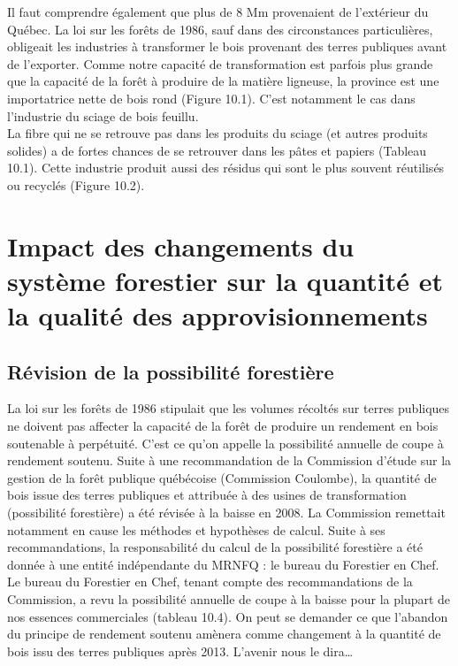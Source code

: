 Il faut comprendre également que plus de 8 Mm provenaient de l'extérieur du Québec. La loi sur les forêts de 1986, sauf dans des circonstances particulières, obligeait les industries à transformer le bois provenant des terres publiques avant de l'exporter. Comme notre capacité de transformation est parfois plus grande que la capacité de la forêt à produire de la matière ligneuse, la province est une importatrice nette de bois rond (Figure 10.1). C'est notamment le cas dans l'industrie du sciage de bois feuillu.\\ 

La fibre qui ne se retrouve pas dans les produits du sciage (et autres produits solides) a de fortes chances de se retrouver dans les pâtes et papiers (Tableau 10.1). Cette industrie produit aussi des résidus qui sont le plus souvent réutilisés ou recyclés (Figure 10.2).


\section{Impact des changements du système forestier sur la quantité et la qualité des approvisionnements}

\subsection{Révision de la possibilité forestière}
La loi sur les forêts  de 1986 stipulait que les volumes récoltés sur terres publiques ne doivent pas affecter la capacité de la forêt de produire un rendement en bois soutenable à perpétuité. C'est ce qu'on appelle la possibilité annuelle de coupe à rendement soutenu. Suite à une recommandation de la Commission d'étude sur la gestion de la forêt publique québécoise (Commission Coulombe), la quantité de bois issue des terres publiques et attribuée à des usines de transformation (possibilité forestière) a été révisée à la baisse en 2008. La Commission remettait notamment en cause les méthodes et hypothèses de calcul. Suite à ses recommandations, la responsabilité du calcul de la possibilité forestière a été donnée à une entité indépendante du MRNFQ : le bureau du Forestier en Chef.\\
 
Le bureau du Forestier en Chef, tenant compte des recommandations de la Commission, a revu la possibilité annuelle de coupe à la baisse pour la plupart de nos essences commerciales (tableau 10.4). On peut se demander ce que l'abandon du principe de rendement soutenu amènera comme changement à la quantité de bois issu des terres publiques après 2013. L'avenir nous le dira…

